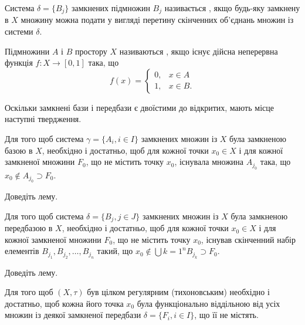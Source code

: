 \begin{definition}
Система $\delta = \{B_j\}$ замкнених підмножин $B_j$ називається , якщо будь-яку замкнену в $X$ множину можна
подати у вигляді перетину скінченних об'єднань множин із
системи $\delta$.
\end{definition}

\begin{definition}
Підмножини $A$ і $B$ простору $X$ називаються
, якщо існує дійсна неперервна
функція $f: X \to [0, 1]$ така, що \[ f(x) = \begin{cases} 0, & x \in A \\ 1, & x \in B. \end{cases} \]
\end{definition}

Оскільки замкнені бази і передбази є двоїстими до
відкритих, мають місце наступні твердження.

\begin{lemma}
Для того щоб система $\gamma = \{A_i, i \in I\}$
замкнених множин із $X$ була замкненою базою в $X$,
необхідно і достатньо, щоб для кожної точки $x_0 \in X$ і для
кожної замкненої множини $F_0$, що не містить точку $x_0$,
існувала множина $A_{j_0}$ така, що $x_0 \notin A_{j_0} \supset F_0$.
\end{lemma}

\begin{exercise}
Доведіть лему.
\end{exercise}

\begin{lemma}
Для того щоб система $\delta = \{B_j, j \in J\}$
замкнених множин із $X$ була замкненою передбазою в $X$,
необхідно і достатньо, щоб для кожної точки $x_0 \in X$ і для
кожної замкненої множини $F_0$, що не містить точку $x_0$,
існував скінченний набір елементів $B_{j_1}, B_{j_2}, \ldots, B_{j_n}$
такий, що $x_0 \notin \bigcup{k = 1}^n B_{j_k} \supset F_0$.
\end{lemma}

\begin{exercise}
Доведіть лему.
\end{exercise}

\begin{theorem}
Для того щоб $(X, \tau)$ був цілком регулярним (тихоновським)
необхідно і достатньо, щоб кожна його точка $x_0$ була
функціонально віддільною від усіх множин із деякої
замкненої передбази $\delta = \{F_i, i \in I\}$, що її не містять.
\end{theorem}

